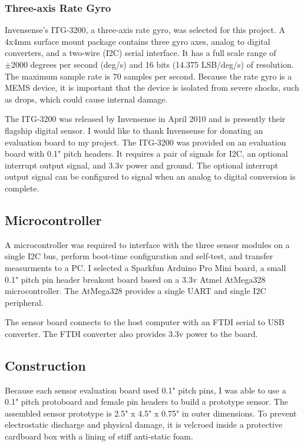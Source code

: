 \documentclass[12pt]{report}
\begin{document}
\subsubsection{Three-axis Rate Gyro}

Invensense's ITG-3200, a three-axis rate gyro, was selected for this project. A 4x4mm surface mount package contains three gyro axes, analog to digital converters, and a two-wire (I2C) serial interface. It has a full scale range of $\pm 2000$ degrees per second (deg/s) and 16 bits (14.375 LSB/deg/s) of resolution. The maximum sample rate is 70 samples per second. Because the rate gyro is a MEMS device, it is important that the device is isolated from severe shocks, such as drops, which could cause internal damage.

The ITG-3200 was released by Invensense in April 2010 and is presently their flagship digital sensor. I would like to thank Invensense for donating an evaluation board to my project. The ITG-3200 was provided on an evaluation board with 0.1" pitch headers. It requires a pair of signals for I2C, an optional interrupt output signal, and 3.3v power and ground. The optional interrupt output signal can be configured to signal when an analog to digital conversion is complete.


\subsection{Microcontroller}
A microcontroller was required to interface with the three sensor modules on a single I2C bus, perform boot-time configuration and self-test, and transfer measurments to a PC. I selected a Sparkfun Arduino Pro Mini board, a small 0.1" pitch pin header breakout board based on a 3.3v Atmel AtMega328 microcontroller. The AtMega328 provides a single UART and single I2C peripheral. 

The sensor board connects to the host computer with an FTDI serial to USB converter. The FTDI converter also provides 3.3v power to the board.


\subsection{Construction}

Because each sensor evaluation board used 0.1" pitch pins, I was able to use a 0.1" pitch protoboard and female pin headers to build a prototype sensor. The assembled sensor prototype is 2.5" x 4.5" x 0.75" in outer dimensions. To prevent electrostatic discharge and physical damage, it is velcroed inside a protective cardboard box with a lining of stiff anti-static foam. 
\end{document}
